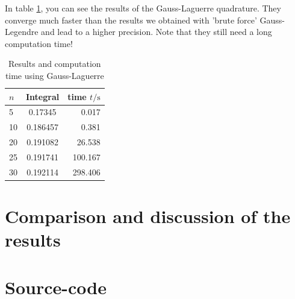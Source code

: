 \documentclass[10pt,a4paper]{article}
\begin{document}
In table \ref{results_lag}, you can see the results of the Gauss-Laguerre quadrature. They converge much faster than the results we obtained with 'brute force' Gauss-Legendre and lead to a higher precision. Note that they still need a long computation time!

\begin{table}[h]
	\caption{Results and computation time using Gauss-Laguerre\label{results_lag}}
	\centering
	\begin{tabular}{lcr}
		$n$	&	Integral	&	time $t/\mathrm{s}$	\\\hline
		5	&	0.17345	&	0.017	\\
		10	&	0.186457	&	0.381	\\
		20	&	0.191082	&	26.538	\\
		25	&	0.191741	&	100.167	\\
		30	&	0.192114	&	298.406	
	\end{tabular}
\end{table}

\section{Comparison and discussion of the results}

\section{Source-code}
\end{document}
